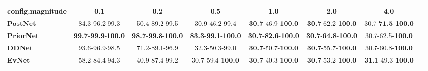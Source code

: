 \begin{tabular}{lccccccc}
\toprule
\textbf{config.magnitude} &                                         0.1 &                                         0.2 &                                         0.5 &                                         1.0 &                                         2.0 &                                4.0 \\
\midrule
\textbf{PostNet } &                              84.3-96.2-99.3 &                              50.4-89.2-99.5 &                              30.9-46.2-99.4 &           \textbf{30.7}-46.9-\textbf{100.0} &           \textbf{30.7}-62.2-\textbf{100.0} &  30.7-\textbf{71.5}-\textbf{100.0} \\
\textbf{PriorNet} &  \textbf{99.7}-\textbf{99.9}-\textbf{100.0} &  \textbf{98.7}-\textbf{99.8}-\textbf{100.0} &  \textbf{83.3}-\textbf{99.1}-\textbf{100.0} &  \textbf{30.7}-\textbf{82.6}-\textbf{100.0} &  \textbf{30.7}-\textbf{64.8}-\textbf{100.0} &           30.7-62.5-\textbf{100.0} \\
\textbf{DDNet   } &                              93.6-96.9-98.5 &                              71.2-89.1-96.9 &                              32.3-50.3-99.0 &           \textbf{30.7}-50.7-\textbf{100.0} &           \textbf{30.7}-55.7-\textbf{100.0} &           30.7-60.8-\textbf{100.0} \\
\textbf{EvNet   } &                              58.2-84.4-94.3 &                              40.9-87.4-99.2 &                    30.7-59.4-\textbf{100.0} &           \textbf{30.7}-40.3-\textbf{100.0} &           \textbf{30.7}-53.2-\textbf{100.0} &  \textbf{31.1}-49.3-\textbf{100.0} \\
\bottomrule
\end{tabular}
